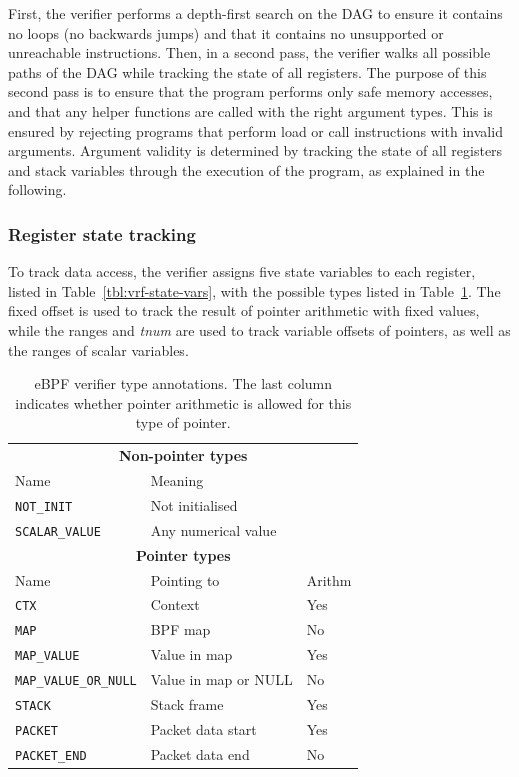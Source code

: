 \documentclass[10pt,sigconf]{acmart}
\begin{document}
First, the verifier performs a depth-first search on the DAG to ensure it
contains no loops (no backwards jumps) and that it contains no unsupported or
unreachable instructions. Then, in a second pass, the verifier walks all
possible paths of the DAG while tracking the state of all registers. The purpose
of this second pass is to ensure that the program performs only safe memory
accesses, and that any helper functions are called with the right argument
types. This is ensured by rejecting programs that perform load or call
instructions with invalid arguments. Argument validity is determined by tracking
the state of all registers and stack variables through the execution of the
program, as explained in the following.

\subsubsection{Register state tracking}
\label{sec:reg-state}
To track data access, the verifier assigns five state variables to each
register, listed in Table~\ref{tbl:vrf-state-vars}, with the possible types listed in
Table~\ref{tbl:reg-types}. The fixed offset is used to track the result of pointer
arithmetic with fixed values, while the ranges and \emph{tnum} are used to track
variable offsets of pointers, as well as the ranges of scalar variables.

\begin{table}[tbp]
\caption{\label{tbl:reg-types}
eBPF verifier type annotations. The last column indicates whether pointer arithmetic is allowed for this type of pointer.}
\centering
\begin{tabular}{lll}
\toprule
\multicolumn{3}{c}{\textbf{Non-pointer types}} \\
Name & Meaning \\
\midrule
\texttt{NOT\_INIT}            & Not initialised         \\
\texttt{SCALAR\_VALUE}        & Any numerical value       \\
\midrule
\multicolumn{3}{c}{\textbf{Pointer types}} \\
Name & Pointing to & Arithm\\
\midrule
\texttt{CTX}                  & Context              & Yes \\
\texttt{MAP}                  & BPF map              & No  \\
\texttt{MAP\_VALUE}           & Value in map         & Yes \\
\texttt{MAP\_VALUE\_OR\_NULL} & Value in map or NULL & No  \\
\texttt{STACK}                & Stack frame          & Yes \\
\texttt{PACKET}               & Packet data start    & Yes \\
\texttt{PACKET\_END}          & Packet data end      & No  \\
\bottomrule
\end{tabular}
\end{table}
\end{document}
